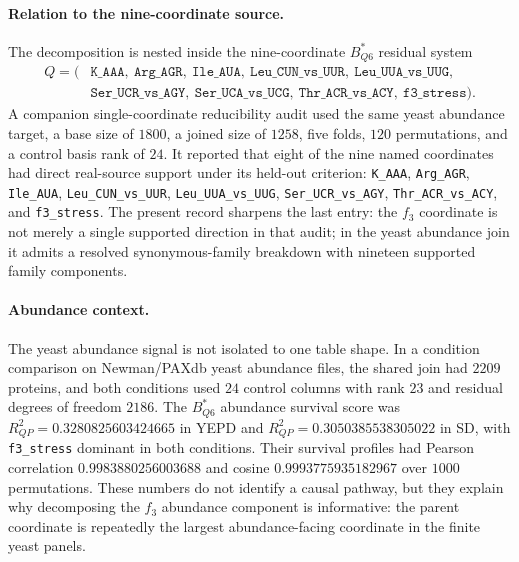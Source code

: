 \paragraph{Relation to the nine-coordinate source.}
The decomposition is nested inside the nine-coordinate $B^*_{Q6}$ residual system
$$
\begin{aligned}
Q = (&\texttt{K\_AAA},\ \texttt{Arg\_AGR},\ \texttt{Ile\_AUA},\ \texttt{Leu\_CUN\_vs\_UUR},\ \texttt{Leu\_UUA\_vs\_UUG},\\
&\texttt{Ser\_UCR\_vs\_AGY},\ \texttt{Ser\_UCA\_vs\_UCG},\ \texttt{Thr\_ACR\_vs\_ACY},\ \texttt{f3\_stress}).
\end{aligned}
$$
A companion single-coordinate reducibility audit used the same yeast abundance target, a base size of $1800$, a joined size of $1258$, five folds, $120$ permutations, and a control basis rank of $24$.  It reported that eight of the nine named coordinates had direct real-source support under its held-out criterion: \texttt{K\_AAA}, \texttt{Arg\_AGR}, \texttt{Ile\_AUA}, \texttt{Leu\_CUN\_vs\_UUR}, \texttt{Leu\_UUA\_vs\_UUG}, \texttt{Ser\_UCR\_vs\_AGY}, \texttt{Thr\_ACR\_vs\_ACY}, and \texttt{f3\_stress}.  The present record sharpens the last entry: the $f_3$ coordinate is not merely a single supported direction in that audit; in the yeast abundance join it admits a resolved synonymous-family breakdown with nineteen supported family components.

\paragraph{Abundance context.}
The yeast abundance signal is not isolated to one table shape.  In a condition comparison on Newman/PAXdb yeast abundance files, the shared join had $2209$ proteins, and both conditions used $24$ control columns with rank $23$ and residual degrees of freedom $2186$.  The $B^*_{Q6}$ abundance survival score was $R^2_{QP}=0.3280825603424665$ in YEPD and $R^2_{QP}=0.3050385538305022$ in SD, with \texttt{f3\_stress} dominant in both conditions.  Their survival profiles had Pearson correlation $0.9983880256003688$ and cosine $0.9993775935182967$ over $1000$ permutations.  These numbers do not identify a causal pathway, but they explain why decomposing the $f_3$ abundance component is informative: the parent coordinate is repeatedly the largest abundance-facing coordinate in the finite yeast panels.

